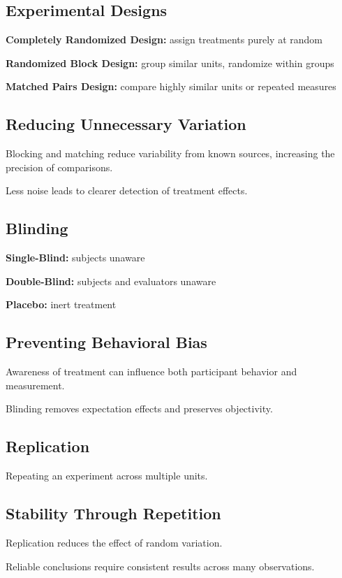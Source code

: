 \documentclass[11pt]{article}
\begin{document}
\begin{tcolorbox}[mybox]
\section*{Experimental Designs}

\textbf{Completely Randomized Design:} assign treatments purely at random  

\textbf{Randomized Block Design:} group similar units, randomize within groups  

\textbf{Matched Pairs Design:} compare highly similar units or repeated measures  

\subsection*{Reducing Unnecessary Variation}

Blocking and matching reduce variability from known sources, increasing the precision of comparisons.

Less noise leads to clearer detection of treatment effects.
\end{tcolorbox}


\begin{tcolorbox}[mybox]
\section*{Blinding}

\textbf{Single-Blind:} subjects unaware  

\textbf{Double-Blind:} subjects and evaluators unaware  

\textbf{Placebo:} inert treatment  

\subsection*{Preventing Behavioral Bias}

Awareness of treatment can influence both participant behavior and measurement.

Blinding removes expectation effects and preserves objectivity.
\end{tcolorbox}


\begin{tcolorbox}[mybox]
\section*{Replication}

Repeating an experiment across multiple units.

\subsection*{Stability Through Repetition}

Replication reduces the effect of random variation.

Reliable conclusions require consistent results across many observations.
\end{tcolorbox}
\end{document}

